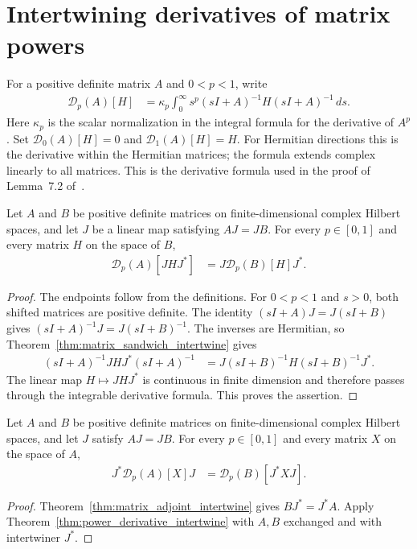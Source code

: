\section{Intertwining derivatives of matrix powers}
\label{sec:power_derivative_intertwine}

For a positive definite matrix $A$ and $0<p<1$, write
\begin{align*}
  \mathcal D_p(A)[H]
    &=\kappa_p\int_0^\infty s^p(sI+A)^{-1}H(sI+A)^{-1}\,ds.
\end{align*}
Here $\kappa_p$ is the scalar normalization in the integral formula
for the derivative of $A^p$. Set $\mathcal D_0(A)[H]=0$ and
$\mathcal D_1(A)[H]=H$. For Hermitian directions this is the derivative
within the Hermitian matrices; the formula extends complex linearly to
all matrices. This is the derivative formula used in the proof of
Lemma~7.2 of~\cite{OpenAI2026AreaLaw}.

\begin{theorem}
  \label{thm:power_derivative_intertwine}
  \leanok
  Let $A$ and $B$ be positive definite matrices on finite-dimensional
  complex Hilbert spaces, and let $J$ be a linear map satisfying $AJ=JB$.
  For every $p\in[0,1]$ and every matrix $H$ on the space of $B$,
  \begin{align*}
    \mathcal D_p(A)[JHJ^*]&=J\mathcal D_p(B)[H]J^*.
  \end{align*}
\end{theorem}

\begin{proof}
  \leanok
  The endpoints follow from the definitions. For $0<p<1$ and $s>0$,
  both shifted matrices are positive definite. The identity
  $(sI+A)J=J(sI+B)$ gives
  $(sI+A)^{-1}J=J(sI+B)^{-1}$.
  The inverses are Hermitian, so
  Theorem~\ref{thm:matrix_sandwich_intertwine} gives
  \begin{align*}
    (sI+A)^{-1}JHJ^*(sI+A)^{-1}
      &=J(sI+B)^{-1}H(sI+B)^{-1}J^*.
  \end{align*}
  The linear map $H\mapsto JHJ^*$ is continuous in finite dimension
  and therefore passes through the integrable derivative formula.
  This proves the assertion.
\end{proof}

\begin{corollary}
  \label{cor:power_derivative_compress}
  \leanok
  Let $A$ and $B$ be positive definite matrices on finite-dimensional
  complex Hilbert spaces, and let $J$ satisfy $AJ=JB$.
  For every $p\in[0,1]$ and every matrix $X$ on the space of $A$,
  \begin{align*}
    J^*\mathcal D_p(A)[X]J
      &=\mathcal D_p(B)[J^*XJ].
  \end{align*}
\end{corollary}

\begin{proof}
  \leanok
  Theorem~\ref{thm:matrix_adjoint_intertwine} gives $BJ^*=J^*A$.
  Apply Theorem~\ref{thm:power_derivative_intertwine} with $A,B$
  exchanged and with intertwiner $J^*$.
\end{proof}
